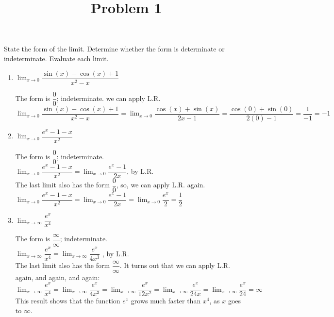 \documentclass{ximera}
\title[Problem 1]{Problem 1}
\begin{document}
\begin{abstract} \end{abstract}
\maketitle


\begin{problem}
State the form of the limit. Determine whether the form is determinate or indeterminate. Evaluate each limit.  
  \begin{enumerate}
      \item  $\displaystyle \lim_{x \to 0}\dfrac{\sin(x)-\cos(x)+1}{x^2-x}$
    \begin{explanation}
    The form is $\dfrac{0}{0}$; indeterminate. we can apply L.R.\\
     $\displaystyle \lim_{x \to 0}\dfrac{\sin(x)-\cos(x)+1}{x^2-x}=\displaystyle \lim_{x \to 0}\dfrac{\cos(x)+\sin(x)}{2x-1}=\dfrac{\cos(0)+\sin(0)}{2(0)-1}=\dfrac{1}{-1}=-1$

    \end{explanation}
  \item  $\displaystyle \lim_{x \to 0}\dfrac{e^x-1-x}{x^2}$
    \begin{explanation}
    The form is $\dfrac{0}{0}$; indeterminate.\\
     $\displaystyle \lim_{x \to 0}\dfrac{e^x-1-x}{x^2}= \displaystyle \lim_{x \to 0}\dfrac{e^x-1}{2x}$, by L.R.\\
     The last limit also has  the form $\dfrac{0}{0}$, so, we can apply L.R. again.\\
     $\displaystyle \lim_{x \to 0}\dfrac{e^x-1-x}{x^2}= \displaystyle \lim_{x \to 0}\dfrac{e^x-1}{2x}= \displaystyle \lim_{x \to 0}\dfrac{e^x}{2}=\dfrac{1}{2}$
    \end{explanation}
     \item  $\displaystyle \lim_{x \to \infty}\dfrac{e^x}{x^4}$
    \begin{explanation}
    The form is $\dfrac{\infty}{\infty}$; indeterminate.\\
    $\displaystyle \lim_{x \to \infty}\dfrac{e^x}{x^4}=\displaystyle \lim_{x \to \infty}\dfrac{e^x}{4x^3}$ , by L.R.\\
     The last limit also has  the form $\dfrac{\infty}{\infty}$. It turns out that we can apply L.R. again, and again, and again:\\
     $\displaystyle \lim_{x \to \infty}\dfrac{e^x}{x^4}=\displaystyle \lim_{x \to \infty}\dfrac{e^x}{4x^3}= \displaystyle \lim_{x \to \infty}\dfrac{e^x}{12x^2}= \displaystyle \lim_{x \to \infty}\dfrac{e^x}{24x}= \displaystyle \lim_{x \to \infty}\dfrac{e^x}{24}=\infty$\\
     This result shows that the function $e^x$ grows much faster than $x^4$, as $x$ goes to $\infty$.
        \end{explanation}
  
      \end{enumerate}
      \end{problem}
\end{document}
